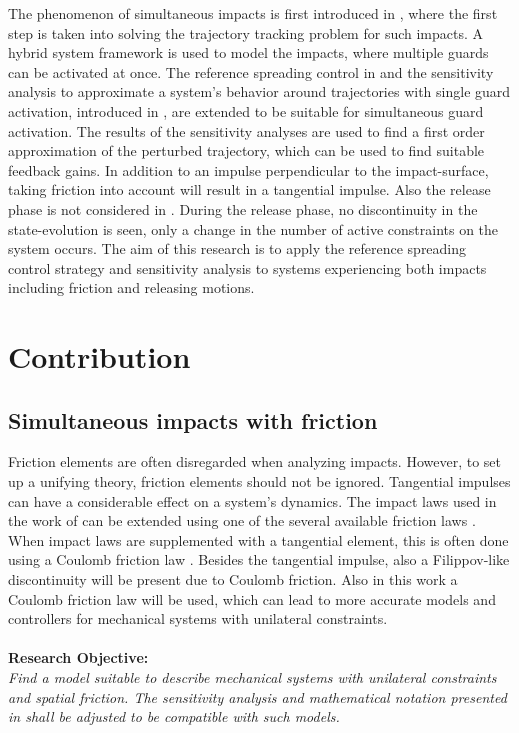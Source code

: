 \documentclass[../DC2017114Bouma.tex]{subfiles}
\begin{document}
The phenomenon of simultaneous impacts is first introduced in \cite{Chen2018a}, where the first step is taken into solving the trajectory tracking problem for such impacts. A hybrid system framework is used to model the impacts, where multiple guards can be activated at once. The reference spreading control in \cite{Rijnen2016,Rijnen2017} and the sensitivity analysis to approximate a system's behavior around trajectories with single guard activation, introduced in \cite{Saccon2014}, are extended to be suitable for simultaneous guard activation. The results of the sensitivity analyses are used to find a first order approximation of the perturbed trajectory, which can be used to find suitable feedback gains. In addition to an impulse perpendicular to the impact-surface, taking friction into account will result in a tangential impulse. Also the release phase is not considered in \cite{Chen2018a}. During the release phase, no discontinuity in the state-evolution is seen, only a change in the number of active constraints on the system occurs. The aim of this research is to apply the reference spreading control strategy and sensitivity analysis to systems experiencing both impacts including friction and releasing motions.

\section{Contribution}

\subsection*{Simultaneous impacts with friction}
Friction elements are often disregarded when analyzing impacts. However, to set up a unifying theory, friction elements should not be ignored. Tangential impulses can have a considerable effect on a system's dynamics. The impact laws used in the work of \cite{Chen2018a} can be extended using one of the several available friction laws \cite{Leine2008}. When impact laws are supplemented with a tangential element, this is often done using a Coulomb friction law \cite{Glocker2014a}. Besides the tangential impulse, also a Filippov-like discontinuity will be present due to Coulomb friction. Also in this work a Coulomb friction law will be used, which can lead to more accurate models and controllers for mechanical systems with unilateral constraints.\\\\
\textbf{Research Objective:}\\
\textit{Find a model suitable to describe mechanical systems with unilateral constraints and spatial friction. The sensitivity analysis and mathematical notation presented in \cite{Chen2018a} shall be adjusted to be compatible with such models.}
\end{document}
